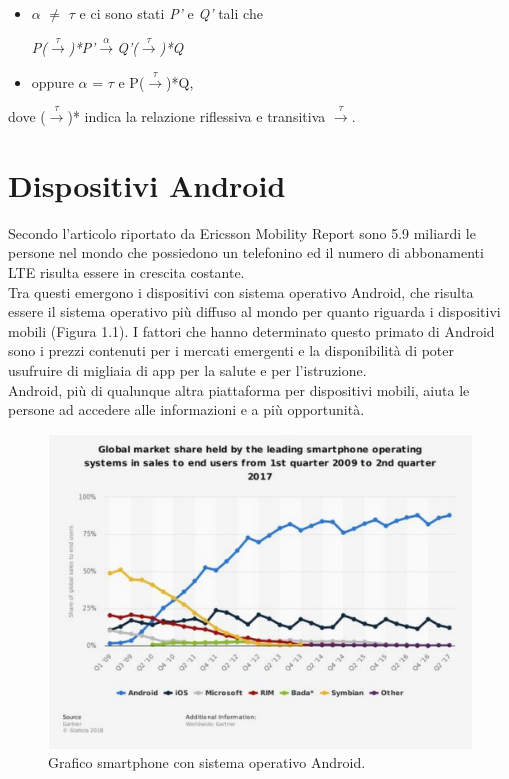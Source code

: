 \documentclass[a4paper,12pt,twoside,openright]{report}
\begin{document}
\begin{itemize}
\item $\alpha$ $\neq$ $\tau$ e ci sono stati \textit{P'} e \textit{Q'} tali che\\
\centerline{\textit{P($\xrightarrow{\tau}$)*P'$\xrightarrow{\alpha}$Q'($\xrightarrow{\tau}$)*Q}}

\item oppure $\alpha$ = $\tau$ e P($\xrightarrow{\tau}$)*Q,
\end{itemize}

dove ($\xrightarrow{\tau}$)* indica la relazione riflessiva e transitiva $\xrightarrow{\tau}$.

\section{Dispositivi Android}
Secondo l'articolo riportato da Ericsson Mobility Report sono 5.9 miliardi le persone nel mondo che possiedono un telefonino ed il numero di abbonamenti LTE risulta essere in crescita costante.\\
Tra questi emergono i dispositivi con sistema operativo Android, che risulta essere il sistema operativo più diffuso al mondo per quanto riguarda i dispositivi mobili (Figura 1.1). I fattori che hanno determinato questo primato di Android sono i prezzi contenuti per i mercati emergenti e la disponibilità di poter usufruire di migliaia di app per la salute e per l'istruzione.\\
Android, più di qualunque altra piattaforma per dispositivi mobili, aiuta le persone ad accedere alle informazioni e a più opportunità.

\begin{figure}[h]
\includegraphics[width=\textwidth]{images/Smartphone Android.png}
\caption{Grafico smartphone con sistema operativo Android.}
\end{figure}
\end{document}
